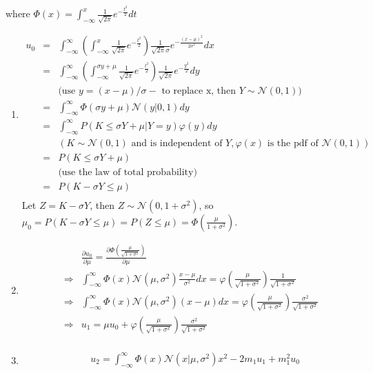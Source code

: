 \documentclass[10pt,a4paper]{article}
\def\MN{{\mathcal N}}
\begin{document}
\begin{enumerate}
\begin{enumerate}
where $\Phi(x) = \int_{-\infty}^{x} \frac{1}{\sqrt{2\pi}} e^{-\frac{t^2}{2}} dt$
\end{enumerate}
\begin{enumerate}
\item 
\begin{eqnarray*}
u_0 &=& \int_{-\infty}^{\infty} \left(\int_{-\infty}^{x} \frac{1}{\sqrt{2\pi}} e^{-\frac{t^2}{2}}\right) \frac{1}{\sqrt{2\pi}\sigma} e^{-\frac{(x-\mu)^2}{2\sigma^2}} dx \\
&=& \int_{-\infty}^{\infty} \left(\int_{-\infty}^{\sigma y+\mu} \frac{1}{\sqrt{2\pi}} e^{-\frac{t^2}{2}}\right) \frac{1}{\sqrt{2\pi}} e^{-\frac{y^2}{2}} dy   \\
&& \mbox{(use }y=(x-\mu)/\sigma-\mbox{ to replace x, then }Y\sim \MN(0,1))\\
&=&\int_{-\infty}^{\infty} \Phi(\sigma y+\mu) \MN(y|0, 1) dy \\
&=&\int_{-\infty}^{\infty} P(K\le \sigma Y+\mu | Y=y) \varphi(y) dy  \\
&&(K \sim \MN(0,1) \mbox{ and is independent of }Y, \varphi(x)\mbox{ is the pdf of }\MN(0,1)) \\
&=&P(K\le \sigma Y+\mu) \\
&&\mbox{(use the law of total probability)}\\
&=&P(K-\sigma Y\le \mu) \\
\end{eqnarray*}
Let $Z=K-\sigma Y$, then $Z\sim \MN(0,1+\sigma^2)$, so $\mu_0=P(K-\sigma Y\le \mu) = P(Z\le \mu) = \Phi(\frac{\mu}{1+\sigma^2})$.
\item 
\begin{eqnarray*}
&& \frac{\partial u_0}{\partial \mu} = \frac{\partial \Phi(\frac{\mu}{\sqrt{1+\sigma^2}})}{\partial \mu} \\
&\Longrightarrow &\int_{-\infty}^{\infty}\Phi(x)\MN(\mu,\sigma^2)\frac{x-\mu}{\sigma^2}dx = \varphi(\frac{\mu}{\sqrt{1+\sigma^2}})\frac{1}{\sqrt{1+\sigma^2}} \\
&\Longrightarrow &\int_{-\infty}^{\infty}\Phi(x)\MN(\mu,\sigma^2)(x-\mu)dx = \varphi(\frac{\mu}{\sqrt{1+\sigma^2}})\frac{\sigma^2}{\sqrt{1+\sigma^2}} \\
&\Longrightarrow &u_1 = \mu u_0+ \varphi(\frac{\mu}{\sqrt{1+\sigma^2}})\frac{\sigma^2}{\sqrt{1+\sigma^2}} \\
\end{eqnarray*}
\item
\begin{eqnarray*}
&& u_2 = \int_{-\infty}^{\infty} \Phi(x) \MN(x|\mu, \sigma^2)x^2 - 2m_1 u_1 + m_1^2u_0 \\

\end{eqnarray*}
\end{enumerate}
\end{enumerate}
\end{document}

